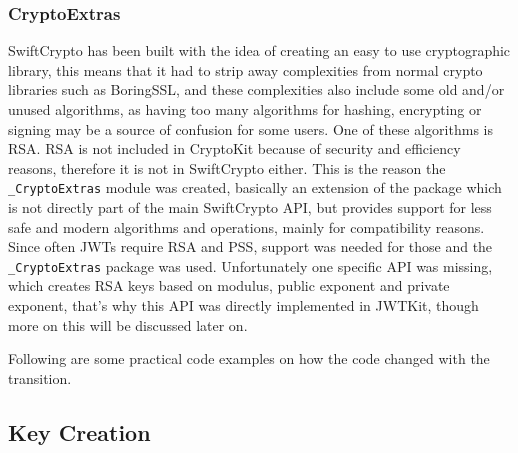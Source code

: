 \subsubsection{CryptoExtras}
SwiftCrypto has been built with the idea of creating an easy to use cryptographic library, this means that it had to strip away complexities from normal crypto libraries such as BoringSSL, and these complexities also include some old and/or unused algorithms, as having too many algorithms for hashing, encrypting or signing may be a source of confusion for some users. One of these algorithms is RSA. RSA is not included in CryptoKit because of security and efficiency reasons, therefore it is not in SwiftCrypto either. This is the reason the \lstinline{_CryptoExtras} module was created, basically an extension of the package which is not directly part of the main SwiftCrypto API, but provides support for less safe and modern algorithms and operations, mainly for compatibility reasons. Since often JWTs require RSA and PSS, support was needed for those and the \lstinline{_CryptoExtras} package was used. Unfortunately one specific API was missing, which creates RSA keys based on modulus, public exponent and private exponent, that's why this API was directly implemented in JWTKit, though more on this will be discussed later on.

Following are some practical code examples on how the code changed with the transition.

\subsection{Key Creation}

